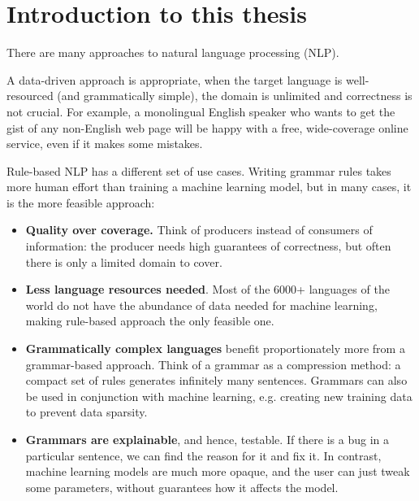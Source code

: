 \chapter{Introduction to this thesis}

There are many approaches to natural language processing (NLP). 

A data-driven approach is appropriate, when the target language is well-resourced (and grammatically simple), the domain is unlimited and correctness is not crucial.
For example, a monolingual English speaker who wants to get the gist of any non-English web page will be happy with a free, wide-coverage online service, even if it makes some mistakes.

Rule-based NLP has a different set of use cases. Writing grammar rules takes more human effort than training a machine learning model, but in many cases, it is the more feasible approach:



\begin{itemize}
\setlength\itemsep{0.0em}
\item \textbf{Quality over coverage.} 
Think of producers instead of consumers of information: the producer needs high guarantees of correctness,
but often there is only a limited domain to cover. %

\item \textbf{Less language resources needed}. Most of the 6000+ languages of the world do not have the abundance of data needed for machine learning, making rule-based approach the only feasible one.

\item \textbf{Grammatically complex languages} benefit proportionately more from a grammar-based approach. 
Think of a grammar as a compression method: a compact set of rules generates infinitely many sentences. 
Grammars can also be used in conjunction with machine learning, e.g. creating new training data to prevent data sparsity.

\item \textbf{Grammars are explainable}, and hence, testable. If there is a bug in a particular sentence, we can find the reason for it and fix it. In contrast, machine learning models are much more opaque, and the user can just tweak some parameters, without guarantees how it affects the model.

\end{itemize}

